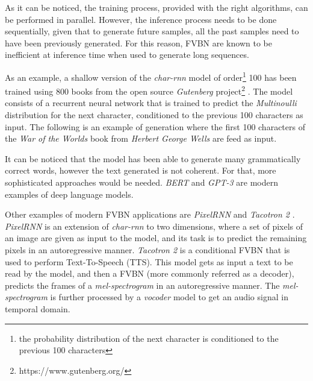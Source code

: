 As it can be noticed, the training process, provided with the right algorithms, can be performed in parallel. However, the inference process needs to be done sequentially, given that to generate future samples, all the past samples need to have been previously generated. For this reason, FVBN are known to be inefficient at inference time when used to generate long sequences.

As an example, a shallow version of the \textit{char-rnn} model of order\footnote{the probability distribution of the next character is conditioned to the previous 100 characters} 100 has been trained using 800 books from the open source \textit{Gutenberg} project\footnote{https://www.gutenberg.org/} \autocite{gerlach2020}. The model consists of a recurrent neural network that is trained to predict the \textit{Multinoulli} distribution for the next character, conditioned to the previous 100 characters as input. The following is an example of generation where the first 100 characters of the \textit{War of the Worlds} book from \textit{Herbert George Wells} are feed as input.


It can be noticed that the model has been able to generate many grammatically correct words, however the text generated is not coherent. For that, more sophisticated approaches would be needed. \textit{BERT} \autocite{davlin2019} and \textit{GPT-3} \autocite{floridi2020} are modern examples of deep language models.

Other examples of modern FVBN applications are \textit{PixelRNN} and \textit{Tacotron 2} \autocite{Wang2017,Shen2018,liu2019b}. \textit{PixelRNN} \autocite{Oord2016, Oord2016b} is an extension of \textit{char-rnn} to two dimensions, where a set of pixels of an image are given as input to the model, and its task is to predict the remaining pixels in an autoregressive manner. \textit{Tacotron 2} is a conditional FVBN that is used to perform Text-To-Speech (TTS). This model gets as input a text to be read by the model, and then a FVBN (more commonly referred as a decoder), predicts the frames of a \textit{mel-spectrogram} in an autoregressive manner. The \textit{mel-spectrogram} is further processed by a \textit{vocoder} model \autocite{vanderoord2016, lorenzotrueba2019} to get an audio signal in temporal domain.

